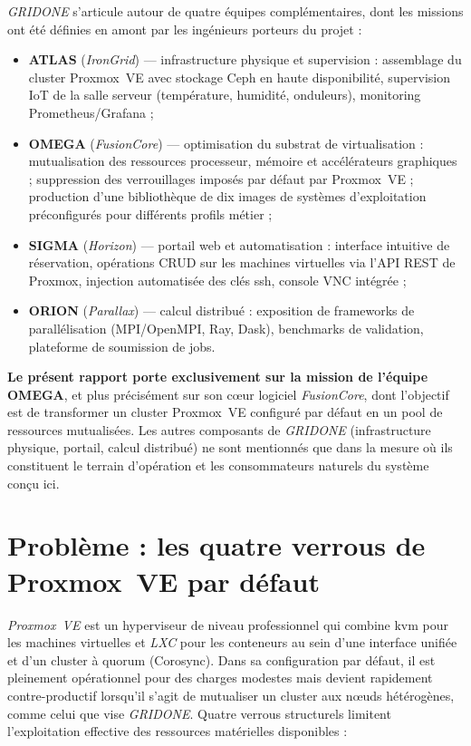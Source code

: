 \emph{GRIDONE} s'articule autour de quatre équipes complémentaires, dont les missions ont été définies en amont par les ingénieurs porteurs du projet :

\begin{itemize}[leftmargin=*]
    \item \textbf{ATLAS} (\emph{IronGrid}) --- infrastructure physique et supervision : assemblage du cluster Proxmox~VE avec stockage Ceph en haute disponibilité, supervision IoT de la salle serveur (température, humidité, onduleurs), monitoring Prometheus/Grafana ;
    \item \textbf{OMEGA} (\emph{FusionCore}) --- optimisation du substrat de virtualisation : mutualisation des ressources processeur, mémoire et accélérateurs graphiques ; suppression des verrouillages imposés par défaut par Proxmox~VE ; production d'une bibliothèque de dix images de systèmes d'exploitation préconfigurés pour différents profils métier ;
    \item \textbf{SIGMA} (\emph{Horizon}) --- portail web et automatisation : interface intuitive de réservation, opérations CRUD sur les machines virtuelles via l'API REST de Proxmox, injection automatisée des clés \acrshort{ssh}, console VNC intégrée ;
    \item \textbf{ORION} (\emph{Parallax}) --- calcul distribué : exposition de frameworks de parallélisation (MPI/OpenMPI, Ray, Dask), benchmarks de validation, plateforme de soumission de jobs.
\end{itemize}

\textbf{Le présent rapport porte exclusivement sur la mission de l'équipe OMEGA}, et plus précisément sur son cœur logiciel \emph{FusionCore}, dont l'objectif est de transformer un cluster Proxmox~VE configuré par défaut en un pool de ressources mutualisées. Les autres composants de \emph{GRIDONE} (infrastructure physique, portail, calcul distribué) ne sont mentionnés que dans la mesure où ils constituent le terrain d'opération et les consommateurs naturels du système conçu ici.

\section*{Problème : les quatre verrous de Proxmox~VE par défaut}

\emph{Proxmox~VE} est un hyperviseur de niveau professionnel qui combine \acrshort{kvm} pour les machines virtuelles et \emph{LXC} pour les conteneurs au sein d'une interface unifiée et d'un cluster à quorum (Corosync). Dans sa configuration par défaut, il est pleinement opérationnel pour des charges modestes mais devient rapidement contre-productif lorsqu'il s'agit de mutualiser un cluster aux nœuds hétérogènes, comme celui que vise \emph{GRIDONE}. Quatre verrous structurels limitent l'exploitation effective des ressources matérielles disponibles :

